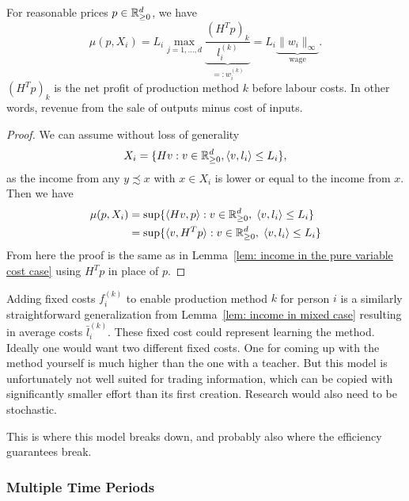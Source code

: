 \begin{lemma}
	For reasonable prices \(p\in \mathbb{R}_{\ge 0}^d\), we have
	\[
		\mu(p, X_i)
		= L_i \max_{j=1,\dots,d}
		\underbrace{\frac{(H^T p)_k}{l_i^{(k)}}}_{=:w_i^{(k)}}
		= L_i \underbrace{\|w_i\|_\infty}_{\text{wage}}.
	\]
	\((H^T p)_k\) is the net profit of production method \(k\) before labour
	costs. In other words, revenue from the sale of outputs minus cost of inputs.
\end{lemma}
\begin{proof}
	We can assume without loss of generality
	\[
		X_i = \{ Hv : v\in \mathbb{R}_{\ge 0}^d, \langle v, l_i\rangle \le L_i\},
	\]
	as the income from any \(y\precsim x\) with \(x\in X_i\) is lower or equal
	to the income from \(x\). Then we have
	\[\begin{aligned}
		\mu(p, X_i)
		&= \sup\{
			\langle Hv, p\rangle :
			v\in \mathbb{R}_{\ge 0}^d,\; \langle v, l_i\rangle \le L_i
		\}\\
		&= \sup\{
			\langle v, H^T p\rangle :
			v\in \mathbb{R}_{\ge 0}^d,\; \langle v, l_i\rangle \le L_i
		\}
	\end{aligned}\]
	From here the proof is the same as in Lemma~\ref{lem: income in the pure variable cost case}
	using \(H^T p\) in place of \(p\).
\end{proof}

Adding fixed costs \(f^{(k)}_i\) to enable production method \(k\) for person
\(i\) is a similarly straightforward generalization from Lemma~\ref{lem: income
in mixed case} resulting in average costs \(\bar{l}_i^{(k)}\). These fixed cost
could represent learning the method. Ideally one would want two different fixed
costs. One for coming up with the method yourself is much higher than the one
with a teacher. But this model is unfortunately not well suited for trading
information, which can be copied with significantly smaller effort
than its first creation. Research would also need to be stochastic.

This is where this model breaks down, and probably also where the efficiency
guarantees break.

\subsubsection{Multiple Time Periods}

